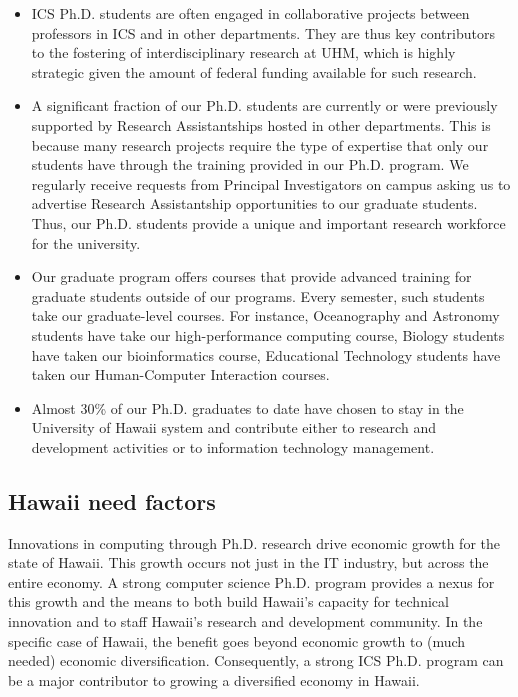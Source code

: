 \documentclass[12pt]{article}
\begin{document}
\begin{itemize}

\item ICS Ph.D. students are often engaged in collaborative projects
  between professors in ICS and in other departments.  They are thus key
  contributors to the fostering of interdisciplinary research at UHM, which
  is highly strategic given the amount of federal funding available for
  such research.

\item A significant fraction of our Ph.D. students are currently or
  were previously supported by Research Assistantships hosted in other
  departments. This is because many research projects require the type of
  expertise that only our students have through the training
  provided in our Ph.D. program. We regularly receive 
  requests from Principal Investigators on campus asking us to advertise
  Research Assistantship opportunities to our graduate students. Thus, our
  Ph.D. students provide a unique and important research workforce for the
  university.

\item Our graduate program offers courses that provide advanced training
  for graduate students outside of our programs. Every semester, such
  students take our graduate-level courses. For instance, Oceanography and
  Astronomy students have take our high-performance computing course,
  Biology students have taken our bioinformatics course, Educational
  Technology students have taken our Human-Computer Interaction courses.

\item Almost 30\% of our Ph.D. graduates to date have chosen to stay in the
  University of Hawaii system and contribute either to research and
  development activities or to information technology management.
\end{itemize}

\subsection{Hawaii need factors}

Innovations in computing through Ph.D. research drive economic growth for
the state of Hawaii. This growth occurs not just in the IT industry, but
across the entire economy.  A strong computer science Ph.D. program
provides a nexus for this growth and the means to both build Hawaii's
capacity for technical innovation and to staff Hawaii’s research and
development community.  In the specific case of Hawaii, the benefit goes
beyond economic growth to (much needed) economic
diversification. Consequently, a strong ICS Ph.D. program can be a major
contributor to growing a diversified economy in Hawaii.
\end{document}

